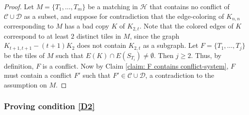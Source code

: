 \documentclass{article}
\theoremstyle{definition}
\begin{document}
\begin{proof}
Let $M = \{T_1,\dots,T_m\}$ be a matching in $\mathcal{H}$ that contains no conflict of $\mathcal{C}\cup \mathcal{D}$ as a subset, and suppose for contradiction that the edge-coloring of $K_{n,n}$ corresponding to $M$ has a bad copy $K$ of $K_{2,t}$.
Note that the colored edges of $K$ correspond to at least $2$ distinct tiles in $M$, since the graph $K_{t+1,t+1}-(t+1)K_2$ does not contain $K_{2,t}$ as a subgraph.  Let $F=\{T_1,\dots,T_j\}$ be the tiles of $M$ such that $E(K)\cap E(S_{T_i}) \neq \emptyset$. Then
$j\geq 2$. Thus, by definition, $F$ is a conflict. Now by Claim \ref{claim: F contains conflict-system}, $F$ must contain a conflict $F'$ such that $F'\in \mathcal{C}\cup \mathcal{D}$, a contradiction to the assumption on $M$.
\end{proof}

\subsubsection{Proving condition \ref{D2}}
\end{document}
